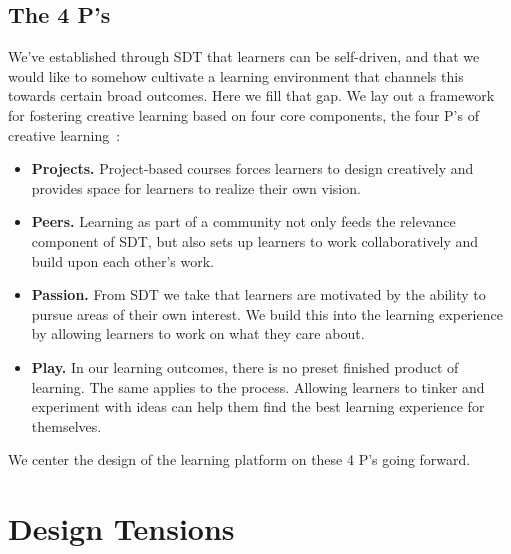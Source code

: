 \documentclass[12pt,twoside]{mitthesis}
\begin{document}
\subsection{The 4 P's}

We've established through SDT that learners can be self-driven, and that we would like to somehow cultivate a learning environment that channels this towards certain broad outcomes. Here we fill that gap. We lay out a framework for fostering creative learning based on four core components, the four P's of creative learning~\cite{cultivating}\cite{resnick2014give}\cite{creativelearningfuturework}:
\begin{itemize}
\item \textbf{Projects.} Project-based courses forces learners to design creatively and provides space for learners to realize their own vision.
\item \textbf{Peers.} Learning as part of a community not only feeds the relevance component of SDT, but also sets up learners to work collaboratively and build upon each other's work.
\item \textbf{Passion.} From SDT we take that learners are motivated by the ability to pursue areas of their own interest. We build this into the learning experience by allowing learners to work on what they care about.
\item \textbf{Play.} In our learning outcomes, there is no preset finished product of learning. The same applies to the process. Allowing learners to tinker and experiment with ideas can help them find the best learning experience for themselves.
\end{itemize}
We center the design of the learning platform on these 4 P's going forward. 

\section{Design Tensions}
\end{document}

